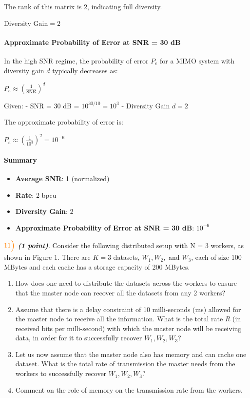 \documentclass[11pt]{article}
\providecommand{\tightlist}{%
      \setlength{\itemsep}{0pt}\setlength{\parskip}{0pt}}
\begin{document}
The rank of this matrix is 2, indicating full diversity.

\(\text{Diversity Gain} = 2\)

\paragraph{Approximate Probability of Error at SNR = 30
dB}\label{approximate-probability-of-error-at-snr-30-db}

In the high SNR regime, the probability of error \(P_e\) for a MIMO
system with diversity gain \(d\) typically decreases as:

\(P_e \approx \left( \frac{1}{\text{SNR}} \right)^d\)

Given: - SNR = 30 dB = \(10^{30/10} = 10^3\) - Diversity Gain \(d = 2\)

The approximate probability of error is:

\(P_e \approx \left( \frac{1}{10^3} \right)^2 = 10^{-6}\)

\paragraph{Summary}\label{summary}

\begin{itemize}
\tightlist
\item
  \textbf{Average SNR}: 1 (normalized)
\item
  \textbf{Rate}: 2 bpcu
\item
  \textbf{Diversity Gain}: 2
\item
  \textbf{Approximate Probability of Error at SNR = 30 dB}: \(10^{-6}\)
\end{itemize}

    \(\color{orange}11\Bigl)\) \textbf{\emph{(1 point)}}. Consider the
following distributed setup with N = 3 workers, as shown in Figure 1.
There are \(K = 3\) datasets, \(W_1, W_2,\) and \(W_3\), each of size
100 MBytes and each cache has a storage capacity of 200 MBytes.

\begin{enumerate}
\def\labelenumi{\alph{enumi})}
\item
  How does one need to distribute the datasets across the workers to
  ensure that the master node can recover all the datasets from any 2
  workers?
\item
  Assume that there is a delay constraint of 10 milli-seconds (ms)
  allowed for the master node to receive all the information. What is
  the total rate \(R\) (in received bits per milli-second) with which
  the master node will be receiving data, in order for it to
  successfully recover \(W_1, W_2, W_3\)?
\item
  Let us now assume that the master node also has memory and can cache
  one dataset. What is the total rate of transmission the master needs
  from the workers to successfully recover \(W_1, W_2, W_3\)?
\item
  Comment on the role of memory on the transmission rate from the
  workers.
\end{enumerate}
\end{document}
